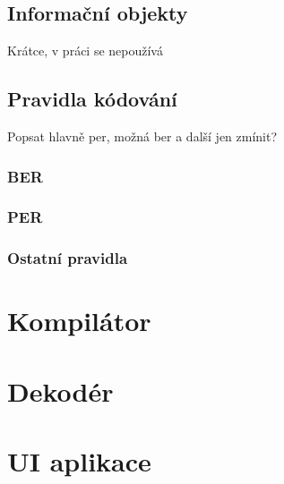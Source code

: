 \section{Informační objekty}
Krátce, v práci se nepoužívá

\section{Pravidla kódování}
Popsat hlavně per, možná ber a další jen zmínit?

\subsection{BER}

\subsection{PER}

\subsection{Ostatní pravidla}

\chapter{Kompilátor}

\chapter{Dekodér}

\chapter{UI aplikace}